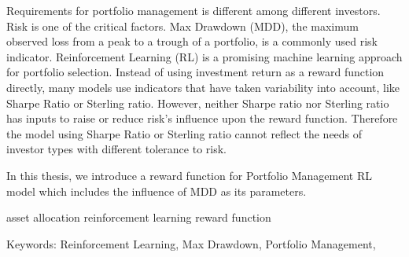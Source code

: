 \begin{abstracten}
Requirements for portfolio management is different among different investors. Risk is one of the critical factors. Max Drawdown (MDD), the maximum observed loss from a peak to a trough of a portfolio, is a commonly used risk indicator. Reinforcement Learning (RL) is a promising machine learning approach for portfolio selection. Instead of using investment return as a reward function directly, many models use indicators that have taken variability into account, like Sharpe Ratio \cite{Sharpe49} or Sterling ratio. However, neither Sharpe ratio nor Sterling ratio has inputs to raise or reduce risk's influence upon the reward function. Therefore the model using Sharpe Ratio \cite{Sharpe49} or Sterling ratio cannot reflect the needs of investor types with different tolerance to risk.

\par
In this thesis, we introduce a reward function for Portfolio Management RL model which includes the influence of MDD as its parameters.   

asset allocation reinforcement learning reward function


\noindent
Keywords: Reinforcement Learning, Max Drawdown, Portfolio Management,
\end{abstracten}
